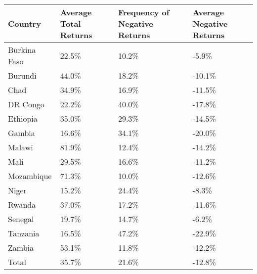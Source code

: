 \begin{table}[ht]
\centering
\begin{tabular}{llll}
  \hline
Country & Average Total Returns & Frequency of Negative Returns & Average Negative Returns \\ 
  \hline
Burkina Faso & 22.5\% & 10.2\% & -5.9\% \\ 
  Burundi & 44.0\% & 18.2\% & -10.1\% \\ 
  Chad & 34.9\% & 16.9\% & -11.5\% \\ 
  DR Congo & 22.2\% & 40.0\% & -17.8\% \\ 
  Ethiopia & 35.0\% & 29.3\% & -14.5\% \\ 
  Gambia & 16.6\% & 34.1\% & -20.0\% \\ 
  Malawi & 81.9\% & 12.4\% & -14.2\% \\ 
  Mali & 29.5\% & 16.6\% & -11.2\% \\ 
  Mozambique & 71.3\% & 10.0\% & -12.6\% \\ 
  Niger & 15.2\% & 24.4\% & -8.3\% \\ 
  Rwanda & 37.0\% & 17.2\% & -11.6\% \\ 
  Senegal & 19.7\% & 14.7\% & -6.2\% \\ 
  Tanzania & 16.5\% & 47.2\% & -22.9\% \\ 
  Zambia & 53.1\% & 11.8\% & -12.2\% \\ 
  Total & 35.7\% & 21.6\% & -12.8\% \\ 
   \hline
\end{tabular}
\end{table}
